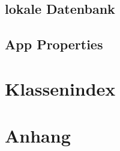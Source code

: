 \documentclass[a4paper,12pt]{article}
\begin{document}
\subsection{lokale Datenbank}
\subsection{App Properties}

\section{Klassenindex}
\section{Anhang}

\clearpage
\printglossaries
{}
\end{document}
